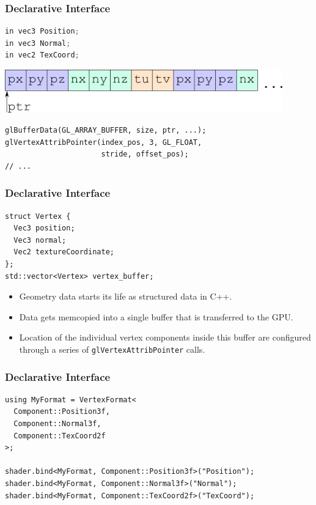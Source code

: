 \documentclass[aspectratio=169]{beamer}
\begin{document}
\begin{frame}[fragile]
  \frametitle{Declarative Interface}
  
  \begin{lstlisting}[language={C}]
in vec3 Position;
in vec3 Normal;
in vec2 TexCoord;
  \end{lstlisting}
  
  \includegraphics[width=0.9\textwidth]{ifgfx/vertex_buffer_0.png}
  
  \begin{lstlisting}[style=cpp20]
glBufferData(GL_ARRAY_BUFFER, size, ptr, ...);
glVertexAttribPointer(index_pos, 3, GL_FLOAT,
                      stride, offset_pos);
// ...
  \end{lstlisting}
\end{frame}

\begin{frame}[fragile]
  \frametitle{Declarative Interface}
  
  \begin{lstlisting}[style=cpp20]
struct Vertex {
  Vec3 position;
  Vec3 normal;
  Vec2 textureCoordinate;
};
std::vector<Vertex> vertex_buffer;
  \end{lstlisting}
  
  \begin{itemize}
  \item Geometry data starts its life as structured data in C++.
  \item Data gets memcopied into a single buffer that is transferred to the GPU.
  \item Location of the individual vertex components inside this buffer are configured through a series of \texttt{glVertexAttribPointer} calls.
  \end{itemize}
\end{frame}

\begin{frame}[fragile]
  \frametitle{Declarative Interface}
  \begin{lstlisting}[style=cpp20]
using MyFormat = VertexFormat<
  Component::Position3f,
  Component::Normal3f,
  Component::TexCoord2f
>;

shader.bind<MyFormat, Component::Position3f>("Position");
shader.bind<MyFormat, Component::Normal3f>("Normal");
shader.bind<MyFormat, Component::TexCoord2f>("TexCoord");
  \end{lstlisting}
\end{frame}
\end{document}
